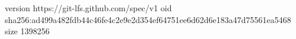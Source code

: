 version https://git-lfs.github.com/spec/v1
oid sha256:ad499a482fdb44c46fe4c2e9e2d354ef64751ee6d62d6e183a47d75561ea5468
size 1398256

